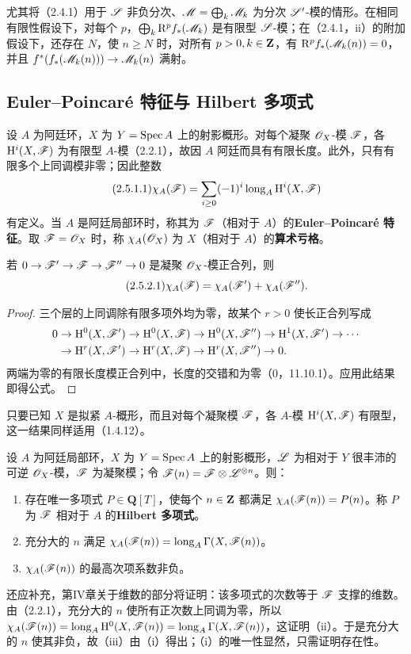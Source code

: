 尤其将（2.4.1）用于 $\mathscr S$ 非负分次、$\mathscr M=\bigoplus_k\mathscr M_k$ 为分次 $\mathscr S'$-模的情形。在相同有限性假设下，对每个 $p$，$\bigoplus_k\mathrm R^pf_*(\mathscr M_k)$ 是有限型 $\mathscr S$-模；在（2.4.1，ii）的附加假设下，还存在 $N$，使 $n\geq N$ 时，对所有 $p>0,k\in\mathbf Z$，有 $\mathrm R^pf_*(\mathscr M_k(n))=0$，并且 $f^*(f_*(\mathscr M_k(n)))\to\mathscr M_k(n)$ 满射。

\subsection{Euler--Poincaré 特征与 Hilbert 多项式}
设 $A$ 为阿廷环，$X$ 为 $Y=\operatorname{Spec} A$ 上的射影概形。对每个凝聚 $\mathscr O_X$-模 $\mathscr F$，各 $\mathrm H^i(X,\mathscr F)$ 为有限型 $A$-模（2.2.1），故因 $A$ 阿廷而具有有限长度。此外，只有有限多个上同调模非零；因此整数
\begin{equation}\tag{2.5.1.1}
\chi_A(\mathscr F)=\sum_{i\geq0}(-1)^i\operatorname{long}_A\mathrm H^i(X,\mathscr F)
\end{equation}
有定义。当 $A$ 是阿廷局部环时，称其为 $\mathscr F$（相对于 $A$）的\textbf{Euler--Poincaré 特征}。取 $\mathscr F=\mathscr O_X$ 时，称 $\chi_A(\mathscr O_X)$ 为 $X$（相对于 $A$）的\textbf{算术亏格}。

若 $0\to\mathscr F'\to\mathscr F\to\mathscr F''\to0$ 是凝聚 $\mathscr O_X$-模正合列，则
\begin{equation}\tag{2.5.2.1}
\chi_A(\mathscr F)=\chi_A(\mathscr F')+\chi_A(\mathscr F'').
\end{equation}
\begin{proof}
三个层的上同调除有限多项外均为零，故某个 $r>0$ 使长正合列写成
\[
\begin{aligned}
0&\to\mathrm H^0(X,\mathscr F')\to\mathrm H^0(X,\mathscr F)\to\mathrm H^0(X,\mathscr F'')\to\mathrm H^1(X,\mathscr F')\to\cdots\\
&\to\mathrm H^r(X,\mathscr F')\to\mathrm H^r(X,\mathscr F)\to\mathrm H^r(X,\mathscr F'')\to0.
\end{aligned}
\]
两端为零的有限长度模正合列中，长度的交错和为零（0，11.10.1）。应用此结果即得公式。
\end{proof}
只要已知 $X$ 是拟紧 $A$-概形，而且对每个凝聚模 $\mathscr F$，各 $A$-模 $\mathrm H^i(X,\mathscr F)$ 有限型，这一结果同样适用（1.4.12）。

设 $A$ 为阿廷局部环，$X$ 为 $Y=\operatorname{Spec} A$ 上的射影概形，$\mathscr L$ 为相对于 $Y$ 很丰沛的可逆 $\mathscr O_X$-模，$\mathscr F$ 为凝聚模；令 $\mathscr F(n)=\mathscr F\otimes\mathscr L^{\otimes n}$。则：
\begin{enumerate}[label=(\roman*)]
\item 存在唯一多项式 $P\in\mathbf Q[T]$，使每个 $n\in\mathbf Z$ 都满足 $\chi_A(\mathscr F(n))=P(n)$。称 $P$ 为 $\mathscr F$ 相对于 $A$ 的\textbf{Hilbert 多项式}。
\item 充分大的 $n$ 满足 $\chi_A(\mathscr F(n))=\operatorname{long}_A\Gamma(X,\mathscr F(n))$。
\item $\chi_A(\mathscr F(n))$ 的最高次项系数非负。
\end{enumerate}
还应补充，第IV章关于维数的部分将证明：该多项式的次数等于 $\mathscr F$ 支撑的维数。
\eproof 由（2.2.1），充分大的 $n$ 使所有正次数上同调为零，所以 $\chi_A(\mathscr F(n))=\operatorname{long}_A\mathrm H^0(X,\mathscr F(n))=\operatorname{long}_A\Gamma(X,\mathscr F(n))$，这证明（ii）。于是充分大的 $n$ 使其非负，故（iii）由（i）得出；（i）的唯一性显然，只需证明存在性。

